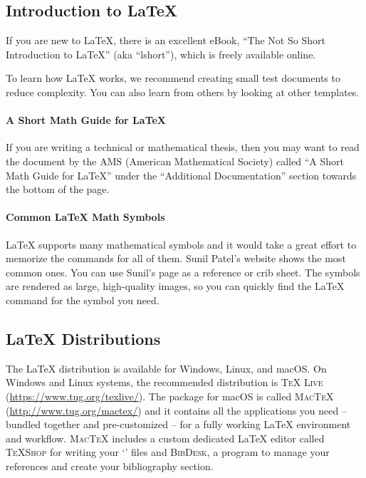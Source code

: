 \subsection{Introduction to LaTeX}

If you are new to LaTeX, there is an excellent eBook, \enquote{The Not So Short Introduction to LaTeX} (aka ``lshort''), which is freely available online.

To learn how LaTeX works, we recommend creating small test documents to reduce complexity. You can also learn from others by looking at other templates.

\paragraph{A Short Math Guide for LaTeX}

If you are writing a technical or mathematical thesis, then you may want to read the document by the AMS (American Mathematical Society) called \enquote{A Short Math Guide for LaTeX}
under the \enquote{Additional Documentation} section towards the bottom of the page.

\paragraph{Common LaTeX Math Symbols}
LaTeX supports many mathematical symbols and it would take a great effort to memorize the commands for all of them. Sunil Patel's website shows the most common ones.
You can use Sunil's page as a reference or crib sheet. The symbols are rendered as large, high-quality images, so you can quickly find the LaTeX command for the symbol you need.

\subsection{LaTeX Distributions}

The LaTeX distribution is available for Windows, Linux, and macOS\@.
On Windows and Linux systems, the recommended distribution is \textsc{TeX Live} (\url{https://www.tug.org/texlive/}).
The package for macOS is called \textsc{MacTeX} (\url{http://www.tug.org/mactex/}) and it contains all the applications you need -- bundled together and pre-customized -- for a fully working LaTeX environment and workflow. \textsc{MacTeX} includes a custom dedicated LaTeX editor called \textsc{TeXShop} for writing your `' files and \textsc{BibDesk}, a program to manage your references and create your bibliography section.



